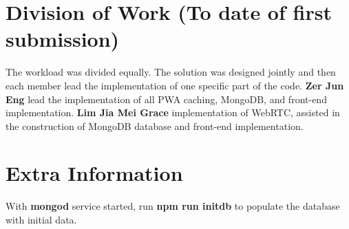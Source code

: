 \documentclass[11pt, a4paper]{article}
\begin{document}
\section{Division of Work (To date of first submission)}
The workload was divided equally. The solution was designed jointly and then each member lead the
implementation of one specific part of the code. \textbf{Zer Jun Eng} lead the implementation of all
PWA caching, MongoDB, and front-end implementation. \textbf{Lim Jia Mei Grace} implementation of
WebRTC, assisted in the construction of MongoDB database and front-end implementation.

\section{Extra Information}
With \textbf{mongod} service started, run \textbf{npm run initdb} to populate the database with
initial data.

\printbibliography
\end{document}
